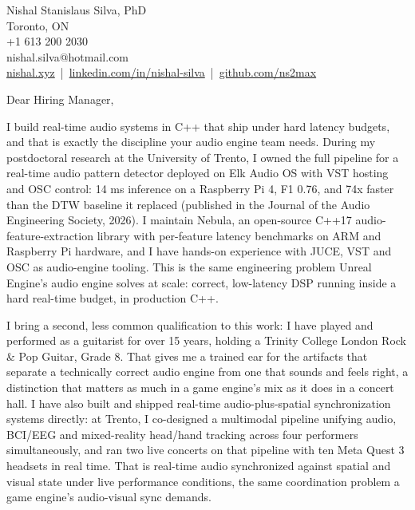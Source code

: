 \documentclass[11pt]{article}
\begin{document}
\pagestyle{empty}

\begin{flushright}
Nishal Stanislaus Silva, PhD \\
Toronto, ON \\
+1 613 200 2030 \\
nishal.silva@hotmail.com \\
\href{https://nishal.xyz}{nishal.xyz} \,|\, \href{https://www.linkedin.com/in/nishal-silva}{linkedin.com/in/nishal-silva} \,|\, \href{https://github.com/ns2max}{github.com/ns2max}
\end{flushright}

\noindent Dear Hiring Manager,

\vspace{0.5em}
\noindent I build real-time audio systems in C++ that ship under hard latency budgets, and that is exactly the discipline your audio engine team needs. During my postdoctoral research at the University of Trento, I owned the full pipeline for a real-time audio pattern detector deployed on Elk Audio OS with VST hosting and OSC control: 14 ms inference on a Raspberry Pi 4, F1 0.76, and 74x faster than the DTW baseline it replaced (published in the Journal of the Audio Engineering Society, 2026). I maintain Nebula, an open-source C++17 audio-feature-extraction library with per-feature latency benchmarks on ARM and Raspberry Pi hardware, and I have hands-on experience with JUCE, VST and OSC as audio-engine tooling. This is the same engineering problem Unreal Engine's audio engine solves at scale: correct, low-latency DSP running inside a hard real-time budget, in production C++.

\vspace{0.5em}
\noindent I bring a second, less common qualification to this work: I have played and performed as a guitarist for over 15 years, holding a Trinity College London Rock \& Pop Guitar, Grade 8. That gives me a trained ear for the artifacts that separate a technically correct audio engine from one that sounds and feels right, a distinction that matters as much in a game engine's mix as it does in a concert hall. I have also built and shipped real-time audio-plus-spatial synchronization systems directly: at Trento, I co-designed a multimodal pipeline unifying audio, BCI/EEG and mixed-reality head/hand tracking across four performers simultaneously, and ran two live concerts on that pipeline with ten Meta Quest 3 headsets in real time. That is real-time audio synchronized against spatial and visual state under live performance conditions, the same coordination problem a game engine's audio-visual sync demands.
\end{document}
